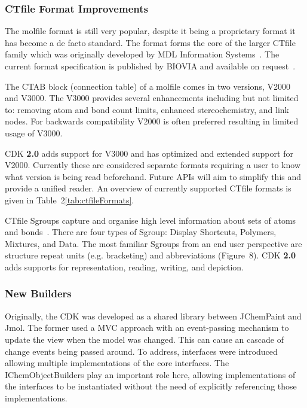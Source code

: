 \documentclass[10pt]{bmcart}
\def \cdkversion {\textbf{2.0}}
\begin{document}
\subsubsection*{CTfile Format Improvements}

The molfile format is still very popular, despite it being a proprietary
format it has become a de facto standard. The format forms the core of the larger
CTfile family which was originally developed by MDL Information Systems~\cite{Dalby92}. The
current format specification is published by BIOVIA and available on 
request~\cite{ctfilespec}.
 
The CTAB block (connection table) of a molfile comes in two versions, V2000
and V3000. The V3000 provides several enhancements including but not
limited to: removing atom and bond count limits, enhanced stereochemistry,
and link nodes. For backwards compatibility V2000 is often preferred resulting
in limited usage of V3000.

CDK \cdkversion{} adds support for V3000 and has optimized and extended
support for V2000. Currently these are considered separate formats requiring
a user to know what version is being read beforehand. Future APIs will aim
to simplify this and provide a unified reader. An overview of currently
supported CTfile formats is given in Table~2\ref{tab:ctfileFormats}.

CTfile Sgroups capture and organise high level information about sets of atoms
and bonds~\cite{Gushurst91}. There are four types of Sgroup: Display Shortcuts, Polymers,
Mixtures, and Data. The most familiar Sgroups from an end user perspective are structure 
repeat units (e.g. bracketing) and abbreviations (Figure~8\label{fig:sgroups}). CDK \cdkversion{} adds 
supports for representation, reading, writing, and depiction.


  \subsubsection*{New Builders}

Originally, the CDK was developed as a shared library between JChemPaint and Jmol. The former
used a MVC approach with an event-passing mechanism to update the view when the model was
changed. This can cause an cascade of change events being passed around. To address,
interfaces were introduced allowing multiple implementations of the core interfaces.
The IChemObjectBuilders play an important role here, allowing implementations of the
interfaces to be instantiated without the need of explicitly referencing those implementations.
\end{document}
